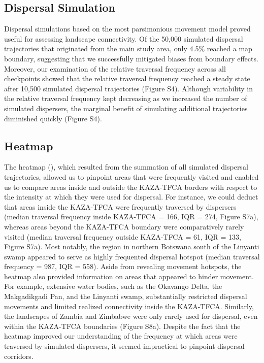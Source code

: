 \documentclass[abstract=on,10pt,a4paper,bibliography=totocnumbered]{article}
\begin{document}
\subsection{Dispersal Simulation}
Dispersal simulations based on the most parsimonious movement model proved
useful for assessing landscape connectivity. Of the 50,000 simulated dispersal
trajectories that originated from the main study area, only 4.5\% reached a map
boundary, suggesting that we successfully mitigated biases from boundary
effects. Moreover, our examination of the relative traversal frequency across
all checkpoints showed that the relative traversal frequency reached a steady
state after 10,500 simulated dispersal trajectories (Figure S4). Although
variability in the relative traversal frequency kept decreasing as we increased
the number of simulated dispersers, the marginal benefit of simulating
additional trajectories diminished quickly (Figure S4).

\subsection{Heatmap}
The heatmap (), which resulted from the summation of all simulated
dispersal trajectories, allowed us to pinpoint areas that were frequently
visited and enabled us to compare areas inside and outside the KAZA-TFCA borders
with respect to the intensity at which they were used for dispersal. For
instance, we could deduct that areas inside the KAZA-TFCA were frequently
traversed by dispersers (median traversal frequency inside KAZA-TFCA = 166, IQR
= 274, Figure S7a), whereas areas beyond the KAZA-TFCA boundary were
comparatively rarely visited (median traversal frequency outside KAZA-TFCA = 61,
IQR = 133, Figure S7a). Most notably, the region in northern Botswana south of
the Linyanti swamp appeared to serve as highly frequented dispersal hotspot
(median traversal frequency = 987, IQR = 558). Aside from revealing movement
hotspots, the heatmap also provided information on areas that appeared to hinder
movement. For example, extensive water bodies, such as the Okavango Delta, the
Makgadikgadi Pan, and the Linyanti swamp, substantially restricted dispersal
movements and limited realized connectivity inside the KAZA-TFCA. Similarly, the
landscapes of Zambia and Zimbabwe were only rarely used for dispersal, even
within the KAZA-TFCA boundaries (Figure S8a). Despite the fact that the heatmap
improved our understanding of the frequency at which areas were traversed by
simulated dispersers, it seemed impractical to pinpoint dispersal corridors.
\end{document}
